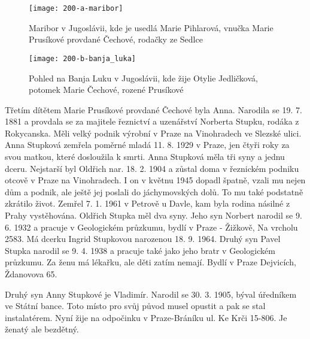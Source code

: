 \documentclass[../dejiny-rodu-prusiku.tex]{subfiles}
\begin{document}
\begin{figure}
\centering
\texttt{[image: 200-a-maribor]}
\caption{Maribor v Jugoslávii, kde je usedlá Marie Pihlarová, vnučka Marie Prusíkové provdané Čechové, rodačky ze Sedlce}
\label{fig:200-a-maribor}
\end{figure}

\begin{figure}
\centering
\texttt{[image: 200-b-banja\_luka]}
\caption{Pohled na Banja Luku v Jugoslávii, kde žije Otylie Jedličková, potomek Marie Čechové, rozené Prusíkové}
\label{fig:200-b-banja_luka}
\end{figure}


Třetím dítětem Marie Prusíkové provdané Čechové byla Anna. Narodila se 19. 7. 1881 a provdala se za majitele řeznictví a uzenářství Norberta Stupku, rodáka z Rokycanska. Měli velký podnik výrobní v Praze na Vinohradech ve Slezské ulici. Anna Stupková zemřela poměrné mladá 11. 8. 1929 v Praze, jen čtyři roky za svou mat­kou, které dosloužila k smrti. Anna Stupková měla tři syny a jednu dceru. Nejstarší byl Oldřich nar. 18. 2. 1904 a zůstal doma v řeznickém podniku otcově v Praze na Vinohradech. I on v květnu 1945 dopadl špatně, vzali mu nejen dům a podnik, ale ještě jej poslali do jáchymov­ských dolů. To mu také podstatně zkrátilo život. Zemřel 7. 1. 1961 v Petrově u Davle, kam byla rodina násilné z Prahy vystěhována. Oldřich Stupka měl dva syny. Jeho syn Norbert narodil se 9. 6. 1932 a pracuje v Geologic­kém průzkumu, bydlí v Praze - Žižkově, Na vrcholu 2583. Má dcerku Ingrid Stupkovou narozenou 18. 9. 1964. Druhý syn Pavel Stupka narodil se 9. 4. 1938 a pracuje také ja­ko jeho bratr v Geologickém průzkumu. Za ženu má lékař­ku, ale děti zatím nemají. Bydlí v Praze Dejvicích, Ždanovova 65.

Druhý syn Anny Stupkové je Vladimír. Narodil se 30. 3. 1905, býval úředníkem ve Státní bance. Toto místo pro svůj původ musel opustit a pak se stal instalatérem. Nyní žije na odpočinku v Praze-Bráníku ul. Ke Krči 15-806. Je ženatý ale bezdětný.
\end{document}
